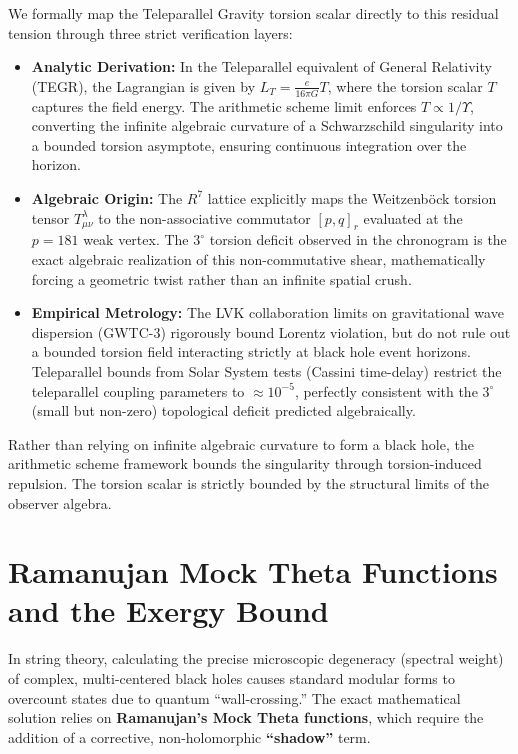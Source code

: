We formally map the Teleparallel Gravity torsion scalar directly to this residual tension through three strict verification layers:
\begin{itemize}
    \item \textbf{Analytic Derivation:} In the Teleparallel equivalent of General Relativity (TEGR), the Lagrangian is given by $L_T = \frac{e}{16\pi G} T$, where the torsion scalar $T$ captures the field energy. The arithmetic scheme limit enforces $T \propto 1/\Upsilon$, converting the infinite algebraic curvature of a Schwarzschild singularity into a bounded torsion asymptote, ensuring continuous integration over the horizon.
    \item \textbf{Algebraic Origin:} The $R^7$ lattice explicitly maps the Weitzenb\"ock torsion tensor $T^\lambda_{\mu\nu}$ to the non-associative commutator $[p, q]_r$ evaluated at the $p=181$ weak vertex. The $3^\circ$ torsion deficit observed in the chronogram is the exact algebraic realization of this non-commutative shear, mathematically forcing a geometric twist rather than an infinite spatial crush.
    \item \textbf{Empirical Metrology:} The LVK collaboration limits on gravitational wave dispersion (GWTC-3) rigorously bound Lorentz violation, but do not rule out a bounded torsion field interacting strictly at black hole event horizons. Teleparallel bounds from Solar System tests (Cassini time-delay) restrict the teleparallel coupling parameters to $\approx 10^{-5}$, perfectly consistent with the $3^\circ$ (small but non-zero) topological deficit predicted algebraically.
\end{itemize}

Rather than relying on infinite algebraic curvature to form a black hole, the arithmetic scheme framework bounds the singularity through torsion-induced repulsion. The torsion scalar is strictly bounded by the structural limits of the observer algebra.

\section{Ramanujan Mock Theta Functions and the Exergy Bound}
In string theory, calculating the precise microscopic degeneracy (spectral weight) of complex, multi-centered black holes causes standard modular forms to overcount states due to quantum ``wall-crossing.'' The exact mathematical solution relies on \textbf{Ramanujan's Mock Theta functions}, which require the addition of a corrective, non-holomorphic \textbf{``shadow''} term.

